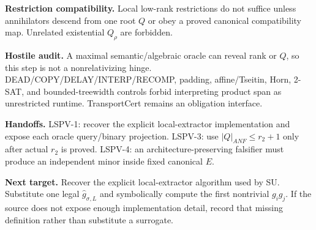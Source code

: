 \documentclass{article}
\begin{document}
\textbf{Restriction compatibility.} Local low-rank restrictions do not suffice unless annihilators descend from one root $Q$ or obey a proved canonical compatibility map. Unrelated existential $Q_\rho$ are forbidden.

\textbf{Hostile audit.} A maximal semantic/algebraic oracle can reveal rank or $Q$, so this step is not a nonrelativizing hinge. DEAD/COPY/DELAY/INTERP/RECOMP, padding, affine/Tseitin, Horn, 2-SAT, and bounded-treewidth controls forbid interpreting product span as unrestricted runtime. TransportCert remains an obligation interface.

\textbf{Handoffs.} LSPV-1: recover the explicit local-extractor implementation and expose each oracle query/binary projection. LSPV-3: use $|Q|_{ANF}\le r_2+1$ only after actual $r_2$ is proved. LSPV-4: an architecture-preserving falsifier must produce an independent minor inside fixed canonical $E$.

\textbf{Next target.} Recover the explicit local-extractor algorithm used by SU. Substitute one legal $\widehat g_{\sigma,L}$ and symbolically compute the first nontrivial $g_i g_j$. If the source does not expose enough implementation detail, record that missing definition rather than substitute a surrogate.
\end{document}
